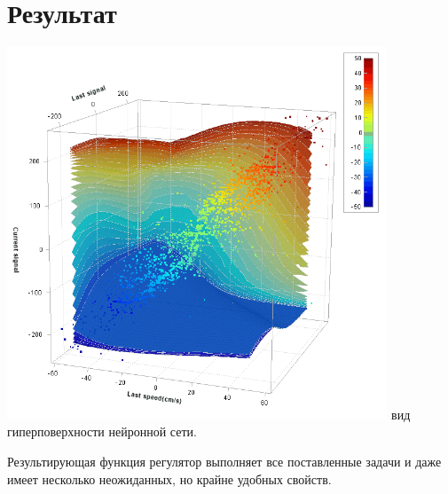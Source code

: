 \documentclass[14pt]{extreport}
\begin{document}
        \section{Результат}
                \begin{center}
                        \includegraphics[width=0.85\textwidth]{surface}
                         вид гиперповерхности нейронной сети.
                \end{center}
        
            Результирующая функция регулятор выполняет все поставленные задачи и даже имеет несколько неожиданных, но крайне удобных свойств.
\end{document}
